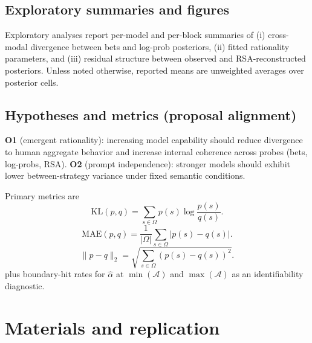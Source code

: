 \documentclass[11pt]{article}
\begin{document}
\subsection{Exploratory summaries and figures}

Exploratory analyses report per-model and per-block summaries of (i) cross-modal divergence between bets and log-prob posteriors, (ii) fitted rationality parameters, and (iii) residual structure between observed and RSA-reconstructed posteriors. Unless noted otherwise, reported means are unweighted averages over posterior cells.



\subsection{Hypotheses and metrics (proposal alignment)}

\textbf{O1} (emergent rationality): increasing model capability should reduce divergence to human aggregate behavior and increase internal coherence across probes (bets, log-probs, RSA). \textbf{O2} (prompt independence): stronger models should exhibit lower between-strategy variance under fixed semantic conditions.

Primary metrics are
\begin{equation}
\mathrm{KL}(p,q)=\sum_{s\in\Omega}p(s)\log\frac{p(s)}{q(s)}.
\end{equation}
\begin{equation}
\mathrm{MAE}(p,q)=\frac{1}{|\Omega|}\sum_{s\in\Omega}|p(s)-q(s)|.
\end{equation}
\begin{equation}
\|p-q\|_2=\sqrt{\sum_{s\in\Omega}(p(s)-q(s))^2}.
\end{equation}
plus boundary-hit rates for $\hat\alpha$ at $\min(\mathcal{A})$ and $\max(\mathcal{A})$ as an identifiability diagnostic.



\section{Materials and replication}

\noindent\begingroup

\setlength{\fboxsep}{5pt}\setlength{\fboxrule}{0.6pt}
\end{document}
